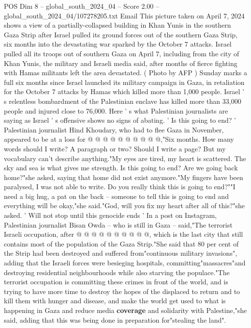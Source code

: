 \begin{textsample}{POS Dim 8 – global\_south\_2024\_04 – Score 2.00 – global\_south\_2024\_04/107278205.txt}  \label{ex:f8_pos_418}
Email This picture taken on April 7, 2024 shows a view of a partially-collapsed building in Khan Yunis in the southern Gaza Strip after Israel pulled its ground forces out of the southern Gaza Strip, six months into the devastating war sparked by the October 7 attacks.
Israel pulled all its troops out of southern Gaza on April 7, including from the city of Khan Yunis, the military and Israeli media said, after months of fierce fighting with Hamas militants left the area devastated. ( Photo by AFP ) Sunday marks a full six months since Israel launched its military campaign in Gaza, in retaliation for the October 7 attacks by Hamas which killed more than 1,000 people.
Israel ' s relentless bombardment of the Palestinian enclave has killed more than 33,000 people and injured close to 76,000.
Here ' s what Palestinian journalists are saying as Israel ' s offensive shows no signs of abating. ' Is this going to end? ' Palestinian journalist Hind Khoudary, who had to flee Gaza in November, appeared to be at a loss for @ @ @ @ @ @ @ @ @ @,"Six months.
How many words should I write?
A paragraph or two?
Should I write a page?
But my vocabulary can't describe anything."My eyes are tired, my heart is scattered.
The sky and sea is what gives me strength.
Is this going to end?
Are we going back home?"she asked, saying that home did not exist anymore."My fingers have been paralysed, I was not able to write.
Do you really think this is going to end?""I need a big hug, a pat on the back -- someone to tell this is going to end and everything will be okay,"she said."God, will you fix my heart after all of this?"she asked. ' Will not stop until this genocide ends ' In a post on Instagram, Palestinian journalist Bisan Owda -- who is still in Gaza -- said,"The terrorist Israeli occupation, after @ @ @ @ @ @ @ @ @ @, which is the last city that still contains most of the population of the Gaza Strip."She said that 80 per cent of the Strip had been destroyed and suffered from"continuous military invasions", adding that the Israeli forces were besieging hospitals, committing"massacres"and destroying residential neighbourhoods while also starving the populace."The terrorist occupation is committing these crimes in front of the world, and is trying to have more time to destroy the hopes of the displaced to return and to kill them with hunger and disease, and make the world get used to what is happening in Gaza and reduce media \textbf{coverage} and solidarity with Palestine,"she said, adding that this was being done in preparation for"stealing the land".

\end{textsample}
